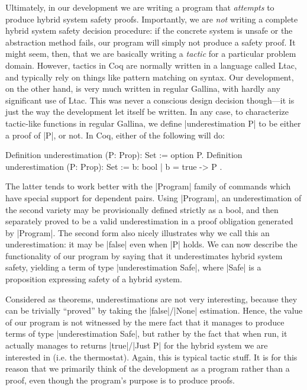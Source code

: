 \documentclass[runningheads]{llncs}
\begin{document}
Ultimately, in our development we are writing a program that \emph{attempts} to produce hybrid system safety proofs. Importantly, we are \emph{not} writing a complete hybrid system safety decision procedure: if the concrete system is unsafe or the abstraction method fails, our program will simply not produce a safety proof. It might seem, then, that we are basically writing a \emph{tactic} for a particular problem domain. However, tactics in Coq are normally written in a language called Ltac, and typically rely on things like pattern matching on syntax. Our development, on the other hand, is very much written in regular Gallina, with hardly any significant use of Ltac. This was never a conscious design decision though---it is just the way the development let itself be written.  In any case, to characterize tactic-like functions in regular Gallina, we define |underestimation P| to be either a proof of |P|, or not. In Coq, either of the following will do:
\begin{code}
Definition underestimation (P: Prop): Set := option P.
Definition underestimation (P: Prop): Set := { b: bool | b = true -> P }.
\end{code}
The latter tends to work better with the |Program| family of commands \cite{bla} which have special support for dependent pairs. Using |Program|, an underestimation of the second variety may be provisionally defined strictly as a bool, and then separately proved to be a valid underestimation in a proof obligation generated by |Program|. The second form also nicely illustrates why we call this an underestimation: it may be |false| even when |P| holds. We can now describe the functionality of our program by saying that it underestimates hybrid system safety, yielding a term of type |underestimation Safe|, where |Safe| is a proposition expressing safety of a hybrid system.

Considered as theorems, underestimations are not very interesting, because they can be trivially ``proved'' by taking the |false|/|None| estimation. Hence, the value of our program is not witnessed by the mere fact that it manages to produce terms of type |underestimation Safe|, but rather by the fact that when run, it actually manages to returns |true|/|Just P| for the hybrid system we are interested in (i.e. the thermostat). Again, this is typical tactic stuff. It is for this reason that we primarily think of the development as a program rather than a proof, even though the program's purpose is to produce proofs.
\end{document}
